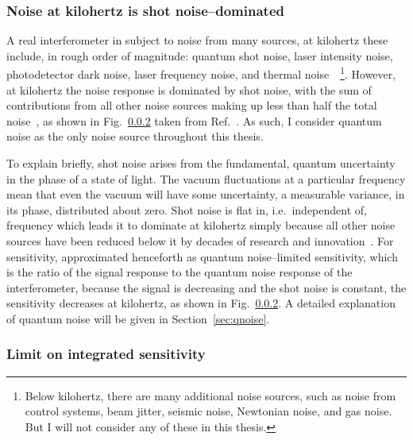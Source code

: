 \subsubsection{Noise at kilohertz is shot noise--dominated}

A real interferometer in subject to noise from many sources, at kilohertz these include, in rough order of magnitude: quantum shot noise, laser intensity noise, photodetector dark noise, laser frequency noise, and thermal noise~\cite{Buikemeetal2020}~\footnote{Below kilohertz, there are many additional noise sources, such as noise from control systems, beam jitter, seismic noise, Newtonian noise, and gas noise. But I will not consider any of these in this thesis.}. However, at kilohertz the noise response is dominated by shot noise, with the sum of contributions from all other noise sources making up less than half the total noise~\cite{}, as shown in Fig.~\ref{} taken from Ref.~\cite{}. As such, I consider quantum noise as the only noise source throughout this thesis.

To explain briefly, shot noise arises from the fundamental, quantum uncertainty in the phase of a state of light. The vacuum fluctuations at a particular frequency mean that even the vacuum will have some uncertainty, a measurable variance, in its phase, distributed about zero. %
Shot noise is flat in, i.e.\ independent of, frequency which leads it to dominate at kilohertz simply because all other noise sources have been reduced below it by decades of research and innovation~\cite{}. For sensitivity, approximated henceforth as quantum noise--limited sensitivity, which is the ratio of the signal response to the quantum noise response of the interferometer, because the signal is decreasing and the shot noise is constant, the sensitivity decreases at kilohertz, as shown in Fig.~\ref{}.
A detailed explanation of quantum noise will be given in Section~\ref{sec:qnoise}.


\subsubsection{Limit on integrated sensitivity}

